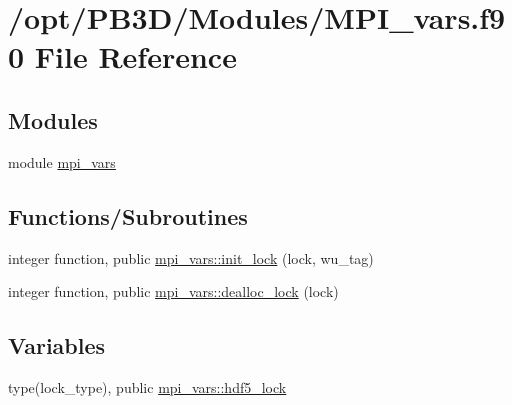 \hypertarget{MPI__vars_8f90}{}\section{/opt/\+P\+B3\+D/\+Modules/\+M\+P\+I\+\_\+vars.f90 File Reference}
\label{MPI__vars_8f90}
\subsection*{Modules}
\begin{DoxyCompactItemize}
\item 
module \hyperlink{namespacempi__vars}{mpi\+\_\+vars}
\end{DoxyCompactItemize}
\subsection*{Functions/\+Subroutines}
\begin{DoxyCompactItemize}
\item 
integer function, public \hyperlink{namespacempi__vars_acfa94ed816882b2e9215bffa1a6ad4a5}{mpi\+\_\+vars\+::init\+\_\+lock} (lock, wu\+\_\+tag)
\item 
integer function, public \hyperlink{namespacempi__vars_a91e7fdacc759ddeb3f14b4241549175c}{mpi\+\_\+vars\+::dealloc\+\_\+lock} (lock)
\end{DoxyCompactItemize}
\subsection*{Variables}
\begin{DoxyCompactItemize}
\item 
type(lock\+\_\+type), public \hyperlink{namespacempi__vars_a834e19cd963fef0ad150e22aa3c56d53}{mpi\+\_\+vars\+::hdf5\+\_\+lock}
\end{DoxyCompactItemize}
